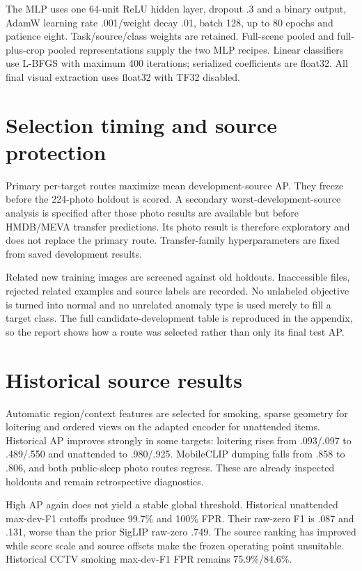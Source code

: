 The MLP uses one 64-unit ReLU hidden layer, dropout .3 and a binary output, AdamW learning rate .001/weight decay .01, batch 128, up to 80 epochs and patience eight. Task/source/class weights are retained. Full-scene pooled and full-plus-crop pooled representations supply the two MLP recipes. Linear classifiers use L-BFGS with maximum 400 iterations; serialized coefficients are float32. All final visual extraction uses float32 with TF32 disabled.

\section{Selection timing and source protection}
Primary per-target routes maximize mean development-source AP. They freeze before the 224-photo holdout is scored. A secondary worst-development-source analysis is specified after those photo results are available but before HMDB/MEVA transfer predictions. Its photo result is therefore exploratory and does not replace the primary route. Transfer-family hyperparameters are fixed from saved development results.

Related new training images are screened against old holdouts. Inaccessible files, rejected related examples and source labels are recorded. No unlabeled objective is turned into normal and no unrelated anomaly type is used merely to fill a target class. The full candidate-development table is reproduced in the appendix, so the report shows how a route was selected rather than only its final test AP.


\section{Historical source results}

Automatic region/context features are selected for smoking, sparse geometry for loitering and ordered views on the adapted encoder for unattended items. Historical AP improves strongly in some targets: loitering rises from .093/.097 to .489/.550 and unattended to .980/.925. MobileCLIP dumping falls from .858 to .806, and both public-sleep photo routes regress. These are already inspected holdouts and remain retrospective diagnostics.

High AP again does not yield a stable global threshold. Historical unattended max-dev-F1 cutoffs produce 99.7\% and 100\% FPR. Their raw-zero F1 is .087 and .131, worse than the prior SigLIP raw-zero .749. The source ranking has improved while score scale and source offsets make the frozen operating point unsuitable. Historical CCTV smoking max-dev-F1 FPR remains 75.9\%/84.6\%.

